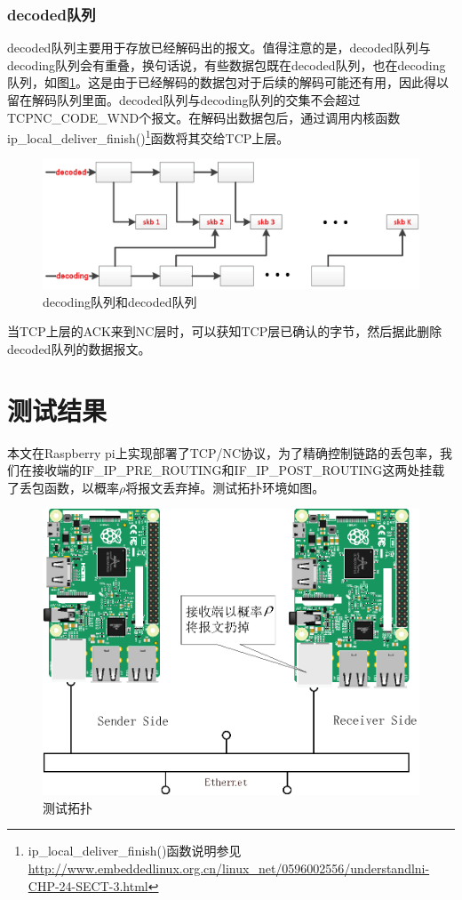 \subsubsection{\textbf{decoded队列}}
decoded队列主要用于存放已经解码出的报文。值得注意的是，decoded队列与decoding队列会有重叠，换句话说，有些数据包既在decoded队列，也在decoding队列，如图\ref{DECODED_EPS}。这是由于已经解码的数据包对于后续的解码可能还有用，因此得以留在解码队列里面。decoded队列与decoding队列的交集不会超过TCPNC\_CODE\_WND个报文。在解码出数据包后，通过调用内核函数ip\_local\_deliver\_finish()\footnote{ip\_local\_deliver\_finish()函数说明参见\url{http://www.embeddedlinux.org.cn/linux_net/0596002556/understandlni-CHP-24-SECT-3.html}}函数将其交给TCP上层。
\begin{figure}[htbp]
	\centering
	\includegraphics[width=5in]{figures/decoded.eps}
	\caption{decoding队列和decoded队列}
	\label{DECODED_EPS}
\end{figure}
当TCP上层的ACK来到NC层时，可以获知TCP层已确认的字节，然后据此删除decoded队列的数据报文。
\section{测试结果}
本文在Raspberry pi上实现部署了TCP/NC协议，为了精确控制链路的丢包率，我们在接收端的IF\_IP\_PRE\_ROUTING和IF\_IP\_POST\_ROUTING这两处挂载了丢包函数，以概率$\rho$将报文丢弃掉。测试拓扑环境如图。

\begin{figure}[htbp]
	\centering
	\includegraphics[width=5in]{figures/tuopu.eps}
	\caption{测试拓扑}
	\label{TUOPU_EPS}
\end{figure}

